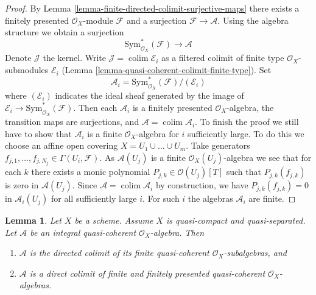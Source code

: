 \documentclass{stacks-project}
\theoremstyle{plain}
\newtheorem{lemma}[subsection]{Lemma}
\theoremstyle{definition}
\theoremstyle{remark}
\numberwithin{equation}{subsection}
\def\colim{\mathop{\mathrm{colim}}\nolimits}
\begin{document}
\begin{proof}
By Lemma \ref{lemma-finite-directed-colimit-surjective-maps}
there exists a finitely presented $\mathcal{O}_X$-module
$\mathcal{F}$ and a surjection $\mathcal{F} \to \mathcal{A}$.
Using the algebra structure we obtain a surjection
$$
\text{Sym}^*_{\mathcal{O}_X}(\mathcal{F}) \longrightarrow \mathcal{A}
$$
Denote $\mathcal{J}$ the kernel. Write $\mathcal{J} = \colim \mathcal{E}_i$
as a filtered colimit of finite type $\mathcal{O}_X$-submodules
$\mathcal{E}_i$ (Lemma \ref{lemma-quasi-coherent-colimit-finite-type}). Set
$$
\mathcal{A}_i = \text{Sym}^*_{\mathcal{O}_X}(\mathcal{F})/(\mathcal{E}_i)
$$
where $(\mathcal{E}_i)$ indicates the ideal sheaf generated by
the image of $\mathcal{E}_i \to \text{Sym}^*_{\mathcal{O}_X}(\mathcal{F})$.
Then each $\mathcal{A}_i$ is a finitely presented $\mathcal{O}_X$-algebra,
the transition maps are surjections,
and $\mathcal{A} = \colim \mathcal{A}_i$. To finish the proof we still
have to show that $\mathcal{A}_i$ is a finite $\mathcal{O}_X$-algebra
for $i$ sufficiently large. To do this we choose an affine open
covering $X = U_1 \cup \ldots \cup U_m$. Take generators
$f_{j, 1}, \ldots, f_{j, N_j} \in \Gamma(U_i, \mathcal{F})$.
As $\mathcal{A}(U_j)$ is a finite $\mathcal{O}_X(U_j)$-algebra we
see that for each $k$ there exists a monic polynomial
$P_{j, k} \in \mathcal{O}(U_j)[T]$ such that $P_{j, k}(f_{j, k})$
is zero in $\mathcal{A}(U_j)$. Since
$\mathcal{A} = \colim \mathcal{A}_i$ by construction, we
have $P_{j, k}(f_{j, k}) = 0$ in $\mathcal{A}_i(U_j)$
for all sufficiently large $i$. For such $i$ the algebras
$\mathcal{A}_i$ are finite.
\end{proof}

\begin{lemma}
\label{lemma-integral-algebra-directed-colimit-finite}
Let $X$ be a scheme. Assume $X$ is quasi-compact and quasi-separated.
Let $\mathcal{A}$ be an integral quasi-coherent $\mathcal{O}_X$-algebra.
Then
\begin{enumerate}
\item $\mathcal{A}$ is the directed colimit of its finite
quasi-coherent $\mathcal{O}_X$-subalgebras, and
\item $\mathcal{A}$ is a direct colimit of finite and finitely
presented quasi-coherent $\mathcal{O}_X$-algebras.
\end{enumerate}
\end{lemma}
\end{document}
